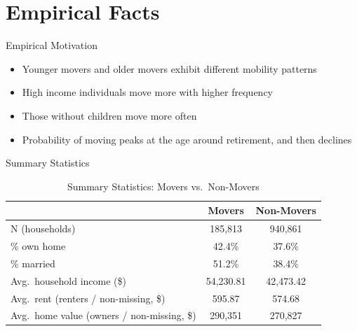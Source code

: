 \documentclass{beamer}
\begin{document}
\section{Empirical Facts}
\begin{frame}{Empirical Motivation}
  \begin{itemize}
    \item Younger movers and older movers exhibit different mobility patterns
    \item High income individuals move more with higher frequency
    \item Those without children move more often
    \item Probability of moving peaks at the age around retirement, and then declines
  \end{itemize}
\end{frame}

\begin{frame}{Summary Statistics}
  \begin{table}[htbp]
  \centering
  \caption{Summary Statistics: Movers vs.\ Non-Movers}
  \label{tab:movers_nonmovers}
    \begin{tabular}{lcc}
      \hline\hline
      & \textbf{Movers} & \textbf{Non-Movers} \\
      \hline
      N (households) & 185{,}813 & 940{,}861 \\
      \% own home & 42.4\% & 37.6\% \\
      \% married & 51.2\% & 38.4\% \\
      Avg.\ household income (\$) & 54{,}230.81 & 42{,}473.42 \\
      Avg.\ rent (renters / non-missing, \$) & 595.87 & 574.68 \\
      Avg.\ home value (owners / non-missing, \$) & 290{,}351 & 270{,}827 \\
      \hline
    \end{tabular}
  \end{table}
\end{frame}
\end{document}
